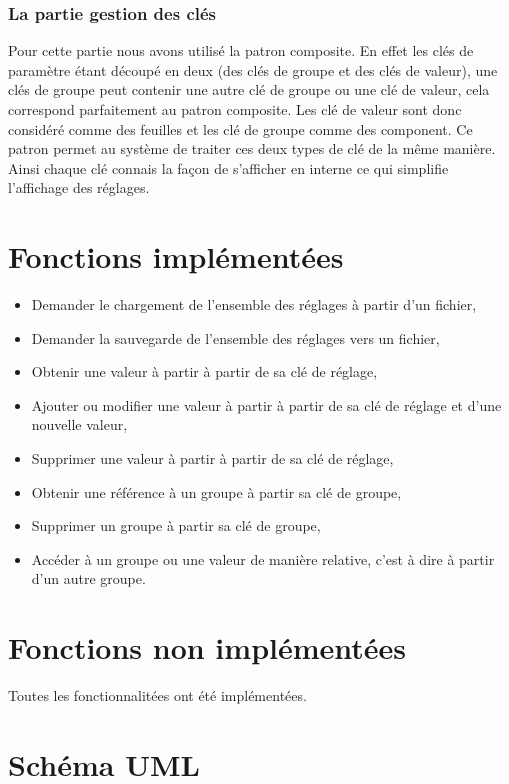 \documentclass[12pt]{article}
\begin{document}
	\subsubsection{La partie gestion des clés}
	
		Pour cette partie nous avons utilisé la patron composite. En effet les clés de paramètre étant découpé en deux (des clés de groupe et des clés de valeur), une clés de groupe peut contenir une autre clé de groupe ou une clé de valeur, cela correspond parfaitement au patron composite. Les clé de valeur sont donc considéré comme des feuilles et les clé de groupe comme des component. Ce patron permet au système de traiter ces deux types de clé de la même manière. Ainsi chaque clé connais la façon de s'afficher en interne ce qui simplifie l'affichage des réglages.
\section{Fonctions implémentées}
\label{sec:fonctions_impl}

\begin{itemize}
	\item Demander le chargement de l’ensemble des réglages à partir d’un fichier,
	\item Demander la sauvegarde de l’ensemble des réglages vers un fichier,
	\item Obtenir une valeur à partir à partir de sa clé de réglage,
	\item Ajouter ou modifier une valeur à partir à partir de sa clé de réglage et d’une nouvelle valeur,
	\item Supprimer une valeur à partir à partir de sa clé de réglage,
	\item Obtenir une référence à un groupe à partir sa clé de groupe,
	\item Supprimer un groupe à partir sa clé de groupe,
	\item Accéder à un groupe ou une valeur de manière relative, c’est à dire à partir d’un autre groupe.
\end{itemize}

\section{Fonctions non implémentées}
\label{sec:fonctions_non_impl}
Toutes les fonctionnalitées ont été implémentées.

\section{Schéma UML}

\end{document}

